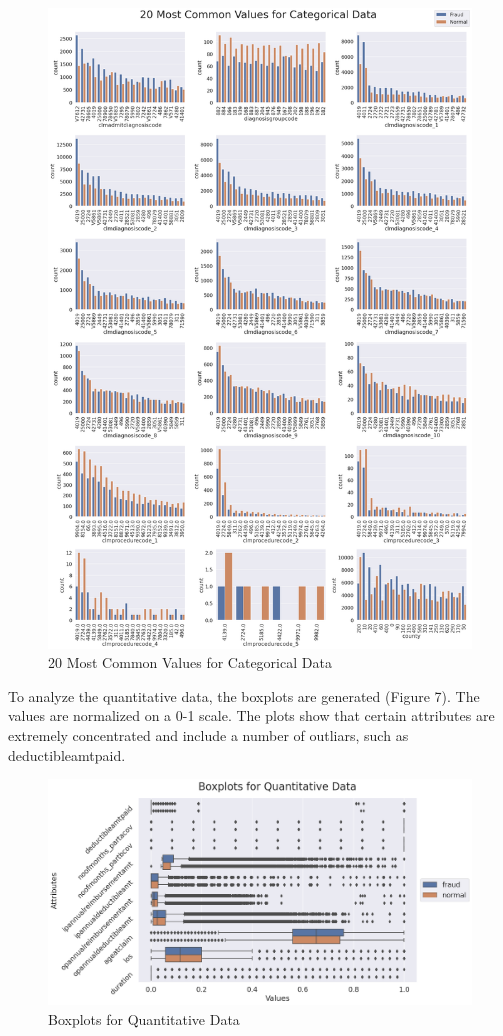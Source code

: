 \documentclass[twoside,11pt]{article}
\begin{document}
\begin{figure}[bp!]
  \centering
  \includegraphics[width=\textwidth]{./img/categorical.png}
  \caption{20 Most Common Values for Categorical Data}
  \label{fig:categorical}
\end{figure}

\newpage
To analyze the quantitative data, the boxplots are generated (Figure 7). The values are normalized on a 
0-1 scale. The plots show that certain attributes are extremely concentrated and include
a number of outliars, such as deductibleamtpaid.
\begin{figure}[!htbp]
  \centering
  \includegraphics[width=\textwidth]{./img/boxplot.png}
  \caption{Boxplots for Quantitative Data}
\end{figure}
\newpage
\end{document}
